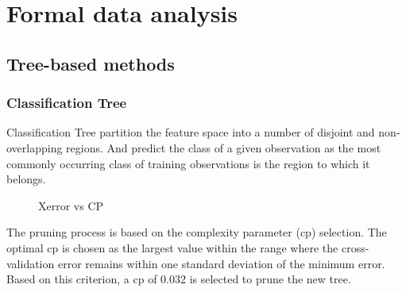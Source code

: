 \documentclass[
  12pt,
  letterpaper,
  DIV=11,
  numbers=noendperiod]{scrartcl}
\begin{document}
\section{Formal data analysis}\label{formal-data-analysis}

\subsection{Tree-based methods}\label{tree-based-methods}

\subsubsection{Classification Tree}\label{classification-tree}

Classification Tree partition the feature space into a number of
disjoint and non-overlapping regions. And predict the class of a given
observation as the most commonly occurring class of training
observations is the region to which it belongs.

\begin{figure}


\caption{\label{fig-tree1}Xerror vs CP}

\end{figure}%

The pruning process is based on the complexity parameter (cp) selection.
The optimal cp is chosen as the largest value within the range where the
cross-validation error remains within one standard deviation of the
minimum error. Based on this criterion, a cp of 0.032 is selected to
prune the new tree.
\end{document}
